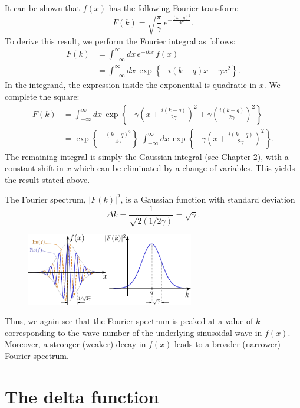 \documentclass[10pt,a4paper]{article}
\begin{document}
It can be shown that $f(x)$ has the following Fourier transform:
\begin{equation}
  F(k) = \sqrt{\frac{\pi}{\gamma}} \, e^{-\frac{(k-q)^2}{4\gamma}}.
\end{equation}
To derive this result, we perform the Fourier integral as follows:
\begin{align}
  F(k) &= \int_{-\infty}^\infty dx \, e^{-ikx}\, f(x) \\
  &= \int_{-\infty}^\infty dx \, \exp\left\{-i(k-q)x -\gamma x^2\right\}.
\end{align}
In the integrand, the expression inside the exponential is quadratic
in $x$. We complete the square:
\begin{align}
  F(k) &= \int_{-\infty}^\infty dx \,
  \exp\left\{-\gamma\left(x + \frac{i(k-q)}{2\gamma}\right)^2
  + \gamma\left(\frac{i(k-q)}{2\gamma}\right)^2\right\} \\
  &= \exp\left\{ - \frac{(k-q)^2}{4\gamma}\right\}\; \int_{-\infty}^\infty dx
  \, \exp\left\{-\gamma\left(x + \frac{i(k-q)}{2\gamma}\right)^2\right\}.
\end{align}
The remaining integral is simply the Gaussian integral (see Chapter
2), with a constant shift in $x$ which can be eliminated by a change
of variables. This yields the result stated above.

The Fourier spectrum, $|F(k)|^2$, is a Gaussian function with standard
deviation
\begin{equation}
  \Delta k = \frac{1}{\sqrt{2(1/2\gamma)}} = \sqrt{\gamma}.  
\end{equation}

\begin{figure}[h]
  \centering\includegraphics[width=0.65\textwidth]{fourier_example4}
\end{figure}

Thus, we again see that the Fourier spectrum is peaked at a value of
$k$ corresponding to the wave-number of the underlying sinusoidal wave
in $f(x)$. Moreover, a stronger (weaker) decay in $f(x)$ leads to a
broader (narrower) Fourier spectrum.

\section{The delta function}\label{delta-function}
\end{document}
